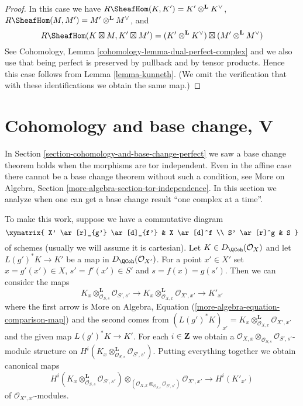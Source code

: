 \begin{proof}
In this case we have $R\SheafHom(K, K') = K' \otimes^\mathbf{L} K^\vee$,
$R\SheafHom(M, M') = M' \otimes^\mathbf{L} M^\vee$, and
$$
R\SheafHom(K \boxtimes M, K' \boxtimes M') =
(K' \otimes^\mathbf{L} K^\vee) \boxtimes
(M' \otimes^\mathbf{L} M^\vee)
$$
See Cohomology, Lemma \ref{cohomology-lemma-dual-perfect-complex}
and we also use that being perfect is preserved by pullback
and by tensor products.
Hence this case follows from Lemma \ref{lemma-kunneth}.
(We omit the verification that with these identifications
we obtain the same map.)
\end{proof}








\section{Cohomology and base change, V}
\label{section-cohomology-base-change}

\noindent
In Section \ref{section-cohomology-and-base-change-perfect}
we saw a base change theorem holds when the morphisms are tor independent.
Even in the affine case there cannot be a base change theorem without such
a condition, see
More on Algebra, Section \ref{more-algebra-section-tor-independence}.
In this section we analyze when one can get a base change result
``one complex at a time''.

\medskip\noindent
To make this work, suppose we have a commutative diagram
$$
\xymatrix{
X' \ar[r]_{g'} \ar[d]_{f'} &
X \ar[d]^f \\
S' \ar[r]^g &
S
}
$$
of schemes (usually we will assume it is cartesian).
Let $K \in D_\QCoh(\mathcal{O}_X)$
and let $L(g')^*K \to K'$ be a map in $D_\QCoh(\mathcal{O}_{X'})$.
For a point $x' \in X'$ set $x = g'(x') \in X$,
$s' = f'(x') \in S'$ and $s = f(x) = g(s')$.
Then we can consider the maps
$$
K_x \otimes_{\mathcal{O}_{S, s}}^\mathbf{L} \mathcal{O}_{S', s'} \to
K_x \otimes_{\mathcal{O}_{X, x}}^\mathbf{L} \mathcal{O}_{X', x'} \to
K'_{x'}
$$
where the first arrow is More on Algebra,
Equation (\ref{more-algebra-equation-comparison-map})
and the second comes from
$(L(g')^*K)_{x'} =
K_x \otimes_{\mathcal{O}_{X, x}}^\mathbf{L} \mathcal{O}_{X', x'}$
and the given map $L(g')^*K \to K'$.
For each $i \in \mathbf{Z}$ we obtain a
$\mathcal{O}_{X, x} \otimes_{\mathcal{O}_{S, s}} \mathcal{O}_{S', s'}$-module
structure on
$H^i(K_x \otimes_{\mathcal{O}_{S, s}}^\mathbf{L} \mathcal{O}_{S', s'})$.
Putting everything together we obtain canonical maps
\begin{equation}
\label{equation-bc}
H^i(K_x \otimes_{\mathcal{O}_{S, s}}^\mathbf{L} \mathcal{O}_{S', s'})
\otimes_{(\mathcal{O}_{X, x} \otimes_{\mathcal{O}_{S, s}} \mathcal{O}_{S', s'})}
\mathcal{O}_{X', x'}
\longrightarrow
H^i(K'_{x'})
\end{equation}
of $\mathcal{O}_{X', x'}$-modules.

